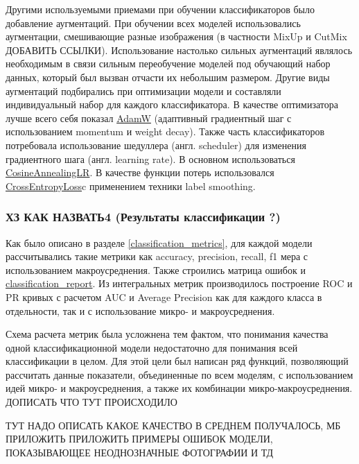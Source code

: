 \documentclass[a4paper,12pt]{extarticle}
\begin{document}
Другими используемыми приемами при обучении классификаторов было добавление аугментаций. При обучении всех моделей использовались аугментации, смешивающие разные изображения (в частности MixUp и CutMix ДОБАВИТЬ ССЫЛКИ). Использование настолько сильных аугментаций являлось необходимым в связи сильным переобучение моделей под обучающий набор данных, который был вызван отчасти их небольшим размером. Другие виды аугментаций подбирались при оптимизации модели и составляли индивидуальный набор для каждого классификатора. В качестве оптимизатора лучше всего себя показал \href{https://pytorch.org/docs/stable/generated/torch.optim.AdamW.html}{AdamW} (адаптивный градиентный шаг с использованием momentum и weight decay). Также часть классификаторов потребовала использование шедуллера (англ. scheduler) для изменения градиентного шага (англ. learning rate). В основном использоваться \href{https://pytorch.org/docs/stable/generated/torch.optim.lr_scheduler.CosineAnnealingLR.html}{CosineAnnealingLR}. В качестве функции потерь использовался \href{https://pytorch.org/docs/stable/generated/torch.nn.CrossEntropyLoss.html}{CrossEntropyLoss}c применением техники label smoothing.

\subsubsection{ХЗ КАК НАЗВАТЬ4 (Результаты классификации ?)}

Как было описано в разделе \ref{classification_metrics}, для каждой модели рассчитывались такие метрики как accuracy, precision, recall, f1 мера с использованием макроусреднения. Также строились матрица ошибок и \href{https://scikit-learn.org/stable/modules/generated/sklearn.metrics.classification_report.html}{classification\_report}. Из интегральных метрик производилось построение ROC и PR кривых с расчетом AUC и Average Precision как для каждого класса в отдельности, так и с использование микро- и макроусреднения.

Схема расчета метрик была усложнена тем фактом, что понимания качества одной классификационной модели недостаточно для понимания всей классификации в целом. Для этой цели был написан ряд функций, позволяющий рассчитать данные показатели, объединенные по всем моделям, с использованием идей микро- и макроусреднения, а также их комбинации микро-макроусреднения. ДОПИСАТЬ ЧТО ТУТ ПРОИСХОДИЛО

ТУТ НАДО ОПИСАТЬ КАКОЕ КАЧЕСТВО В СРЕДНЕМ ПОЛУЧАЛОСЬ, МБ ПРИЛОЖИТЬ ПРИЛОЖИТЬ ПРИМЕРЫ ОШИБОК МОДЕЛИ, ПОКАЗЫВАЮЩЕЕ НЕОДНОЗНАЧНЫЕ ФОТОГРАФИИ И ТД
\end{document}
